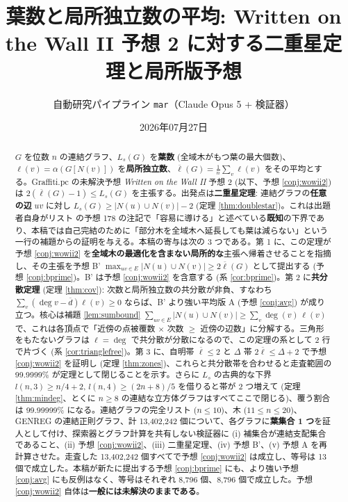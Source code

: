 \documentclass[paper=a4,fontsize=10.5pt,jafontsize=10.5pt]{jlreq}
\title{葉数と局所独立数の平均: Written on the Wall II 予想 2 に対する二重星定理と局所版予想}
\author{自動研究パイプライン \texttt{mar}（Claude Opus 5 + 検証器）}
\date{2026年07月27日}
\theoremstyle{plain}
\theoremstyle{definition}
\begin{document}
\maketitle

\begin{abstract}
$G$ を位数 $n$ の連結グラフ、$L_s(G)$ を\textbf{葉数} (全域木がもつ葉の最大個数)、$\ell(v) = \alpha(G[N(v)])$ を\textbf{局所独立数}、$\overline{\ell}(G) = \frac{1}{n}\sum_v \ell(v)$ をその平均とする。Graffiti.pc の未解決予想 \emph{Written on the Wall II} 予想 2 (以下、予想 \ref{conj:wowii2}) は $2(\overline{\ell}(G) - 1) \le L_s(G)$ を主張する。出発点は\textbf{二重星定理}: 連結グラフの\textbf{任意の辺} $uv$ に対し $L_s(G) \ge |N(u) \cup N(v)| - 2$ (定理 \ref{thm:doublestar})。これは出題者自身がリスト \cite{wowii} の予想 178 の注記で「容易に導ける」と述べている\textbf{既知}の下界であり、本稿では自己完結のために「部分木を全域木へ延長しても葉は減らない」という一行の補題からの証明を与える。本稿の寄与は次の 3 つである。第 1 に、この定理が予想 \ref{conj:wowii2} を\textbf{全域木の最適化を含まない局所的な}主張へ帰着させることを指摘し、その主張を予想 B' $\max_{uv \in E} |N(u) \cup N(v)| \ge 2\overline{\ell}(G)$ として提出する (予想 \ref{conj:bprime})。B' は予想 \ref{conj:wowii2} を含意する (系 \ref{cor:bprime})。第 2 に\textbf{共分散定理} (定理 \ref{thm:cov}): 次数と局所独立数の共分散が非負、すなわち $\sum_v (\deg v - \overline{d})\ell(v) \ge 0$ ならば、B' より強い平均版 A (予想 \ref{conj:avg}) が成り立つ。核心は補題 \ref{lem:sumbound} $\sum_{uv \in E} |N(u) \cup N(v)| \ge \sum_v \deg(v)\,\ell(v)$ で、これは各頂点で「近傍の点被覆数 $\times$ 次数 $\ge$ 近傍の辺数」に分解する。三角形をもたないグラフは $\ell = \deg$ で共分散が分散になるので、この定理の系として 2 行で片づく (系 \ref{cor:trianglefree})。第 3 に、自明帯 $\overline{\ell} \le 2$ と $\Delta$ 帯 $2\overline{\ell} \le \Delta + 2$ で予想 \ref{conj:wowii2} を証明し (定理 \ref{thm:zones})、これらと共分散帯を合わせると走査範囲の 99.9999\% が定理として閉じることを示す。さらに $L_s$ の古典的な下界 $l(n,3) \ge n/4 + 2$, $l(n,4) \ge (2n+8)/5$ を借りると帯が 2 つ増えて (定理 \ref{thm:mindeg}、とくに $n \ge 8$ の連結な立方体グラフはすべてここで閉じる)、覆う割合は 99.99999\% になる。連結グラフの完全リスト ($n \le 10$)、木 ($11 \le n \le 20$)、GENREG の連結正則グラフ、計 13,402,242 個について、各グラフに\textbf{葉集合 1 つ}を証人として付け、探索器とグラフ計算を共有しない検証器に (i) 補集合が連結支配集合であること、(ii) 予想 \ref{conj:wowii2}、(iii) 二重星定理、(iv) 予想 B'、(v) 予想 A を再計算させた。走査した 13,402,242 個すべてで予想 \ref{conj:wowii2} は成立し、等号は 13 個で成立した。本稿が新たに提出する予想 \ref{conj:bprime} にも、より強い予想 \ref{conj:avg} にも反例はなく、等号はそれぞれ 8,796 個、8,796 個で成立した。予想 \ref{conj:wowii2} 自体は\textbf{一般には未解決のままである}。
\end{abstract}
\end{document}
